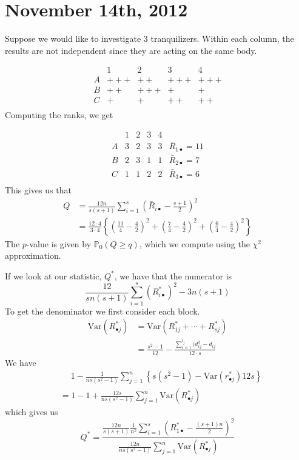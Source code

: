 \documentclass[a4paper,12pt]{amsart}
\newcommand{\Var}{\mbox{Var}}
\begin{document}
\section{November 14th, 2012}
Suppose we would like to investigate 3 tranquilizers. Within each column, the results are not independent since they are acting on the same body.

\[\begin{array}{c|r|r|r|r}
  & 1 & 2 & 3 & 4\\
  \hline
A & +++ &++  & +++ & +++\\
\hline
B & ++ & +++ & + & + \\
\hline
C & +  & + & ++ & ++\\
\end{array} \]
Computing the ranks, we get

\[\begin{array}{c|r|r|r|r||l}
  & 1 & 2 & 3 & 4 & \\
  \hline
A & 3 & 2  & 3 & 3 & \bar{R}_{1\bullet}=11 \\
\hline
B & 2 & 3 & 1 & 1 & \bar{R}_{2\bullet}=7  \\
\hline
C & 1  & 1 & 2 & 2  & \bar{R}_{3\bullet}=6\\
\end{array} \]
This gives us that
\begin{align*}
Q &= \frac{12n}{s(s+1)}\sum_{i=1}^s \left(\bar{R}_{i \bullet} - \frac{s+1}{2}\right)^2\\
&= \frac{12 \cdot 4}{3 \cdot 4} \left\{\left(\frac{11}{4} - \frac{4}{2}\right)^2 + \left(\frac{7}{4} - \frac{4}{2}\right)^2 + \left(\frac{6}{4} - \frac{4}{2}\right)^2\right\}
\end{align*}
The $p$-value is given by $\mathbb{P}_0(Q \geq q)$, which we compute using the $\chi^2$ approximation.

If we look at our statistic, $Q^*$, we have that the numerator is
\[\frac{12}{sn(s+1)}\sum_{i=1}^s (R_{i\bullet}^*)^2 - 3n(s+1)\]
To get the denominator we first consider each block.
\begin{align*}
\Var(R_{\bullet j}^*) &= \Var(R_{1j}^* + \cdots + R_{sj}^*)\\
&=\frac{s^2-1}{12} - \frac{\sum_{i=1}^{l_j} (d_{ij}^3 - d_{ij}}{12 \cdot s}
\end{align*}
We have
\begin{align*}
&\quad \; 1 - \frac{1}{ns(s^2-1)}\sum_{j=1}^n \left\{s(s^2-1) - \Var(r_{\bullet j}^*)12s\right\}\\
&= 1 - 1 + \frac{12s}{ns(s^2-1)}\sum_{j=1}^n \Var(R_{\bullet j}^*)
\end{align*}
which gives us
\[Q^* = \frac{\frac{12n}{s(s+1)}\frac{1}{n^2}\sum_{i=1}^s \left(R_{1\bullet}^* - \frac{(s+1)n}{2}\right)^2}{\frac{12n}{ns(s^2-1)}\sum_{j=1}^n \Var(R_{\bullet j}^*)}\]
\end{document}
